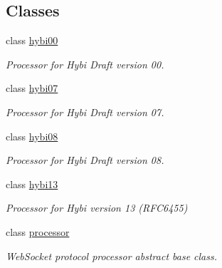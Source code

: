 \subsection*{Classes}
\begin{DoxyCompactItemize}
\item 
class \mbox{\hyperlink{classwebsocketpp_1_1processor_1_1hybi00}{hybi00}}
\begin{DoxyCompactList}\small\item\em Processor for Hybi Draft version 00. \end{DoxyCompactList}\item 
class \mbox{\hyperlink{classwebsocketpp_1_1processor_1_1hybi07}{hybi07}}
\begin{DoxyCompactList}\small\item\em Processor for Hybi Draft version 07. \end{DoxyCompactList}\item 
class \mbox{\hyperlink{classwebsocketpp_1_1processor_1_1hybi08}{hybi08}}
\begin{DoxyCompactList}\small\item\em Processor for Hybi Draft version 08. \end{DoxyCompactList}\item 
class \mbox{\hyperlink{classwebsocketpp_1_1processor_1_1hybi13}{hybi13}}
\begin{DoxyCompactList}\small\item\em Processor for Hybi version 13 (R\+F\+C6455) \end{DoxyCompactList}\item 
class \mbox{\hyperlink{classwebsocketpp_1_1processor_1_1processor}{processor}}
\begin{DoxyCompactList}\small\item\em Web\+Socket protocol processor abstract base class. \end{DoxyCompactList}\end{DoxyCompactItemize}
